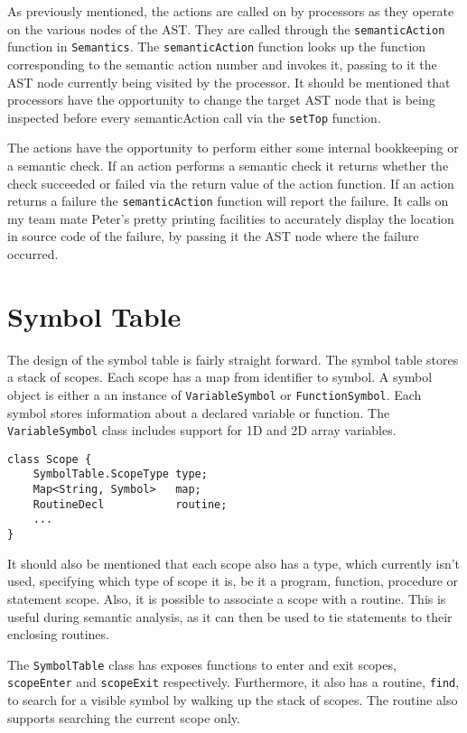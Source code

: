 \documentclass[oneside]{amsart}
\theoremstyle{definition}
\theoremstyle{remark}
\numberwithin{equation}{section}
\begin{document}
As previously mentioned, the actions are called on by processors as they operate
on the various nodes of the AST. They are called through the
\texttt{semanticAction} function in \texttt{Semantics}. The
\texttt{semanticAction} function looks up the function corresponding to the
semantic action number and invokes it, passing to it the AST node currently
being visited by the processor. It should be mentioned that processors have the
opportunity to change the target AST node that is being inspected before every
semanticAction call via the \texttt{setTop} function.

The actions have the opportunity to perform either some internal bookkeeping or
a semantic check. If an action performs a semantic check it returns whether the
check succeeded or failed via the return value of the action function. If an
action returns a failure the \texttt{semanticAction} function will report the
failure. It calls on my team mate Peter's pretty printing facilities to
accurately display the location in source code of the failure, by passing it the
AST node where the failure occurred.

\section{Symbol Table}
The design of the symbol table is fairly straight forward. The symbol table
stores a stack of scopes. Each scope has a map from identifier to symbol. A
symbol object is either a an instance of \texttt{VariableSymbol} or
\texttt{FunctionSymbol}. Each symbol stores information about a declared
variable or function. The \texttt{VariableSymbol} class includes support for
1D and 2D array variables.

\begin{lstlisting}
class Scope {
    SymbolTable.ScopeType type;
    Map<String, Symbol>   map;
    RoutineDecl           routine;
    ...
}
\end{lstlisting}

It should also be mentioned that each scope also has a type, which currently
isn't used, specifying which type of scope it is, be it a program, function,
procedure or statement scope. Also, it is possible to associate a scope with
a routine. This is useful during semantic analysis, as it can then be used to
tie statements to their enclosing routines.

The \texttt{SymbolTable} class has exposes functions to enter and exit scopes,
\texttt{scopeEnter} and \texttt{scopeExit} respectively. Furthermore, it also
has a routine, \texttt{find}, to search for a visible symbol by walking up the
stack of scopes. The routine also supports searching the current scope only.

\end{document}
